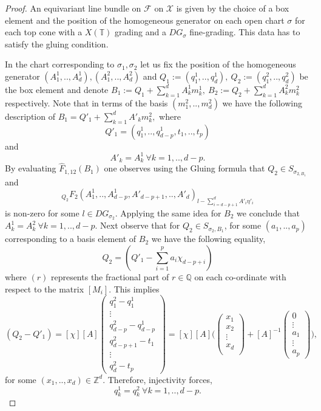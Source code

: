 \documentclass[10pt]{amsart}
\newcommand{\sX}{{\mathcal X}}
\numberwithin{equation}{subsection}
\begin{document}
\begin{proof}
An equivariant line bundle on $\mathscr{F}$ on $\sX$ is given by the choice of a box element and the position of the homogeneous generator on each open chart $\sigma$ for each top cone with a $X(\mathbb{T})$ grading and a $DG_{\sigma}$ fine-grading. This data has to satisfy the gluing condition.\par
In the chart corresponding to $\sigma_1,\sigma_2$ let us fix the position of the homogeneous generator $(A^1_1,..,A^1_d),(A^2_1,..,A^2_d)$ and $Q_1:=(q^1_1,..,q^1_d),\ Q_2:=(q^2_1,..,q^2_d)$ be the box element and denote $B_1:=Q_1+\sum_{k=1}^{d}A^1_km^1_k,\ B_2:=Q_2+\sum_{k=1}^{d}A^2_km^2_k$ respectively. Note that in terms of the basis $(m^2_1,..,m^2_d)$ we have the following description of $B_1=Q'_1+\sum_{k=1}^{d}A'_km^2_k,$ where 
$$Q'_1=(q^1_1,..,q^1_{d-p},t_1,..,t_p)$$ and $$A'_k=A^1_k\ \forall k=1,..,d-p.$$
By evaluating $\hat{F}_{1,12}(B_1)$ one observes using the Gluing formula that $Q_2\in S_{\sigma_{2,B_1}}$ and $${}_{Q_2}F_{2}(A^1_1,..,A^1_{d-p},A'_{d-p+1},..,A'_{d})_{l-\sum_{i=d-p+1}^{d}A'_{i}\eta'_{i}}$$ is non-zero for some $l\in DG_{\sigma_2}$. Applying the same idea for $B_2$ we conclude that $A^1_k=A^2_k\  \forall k=1,..,d-p.$\newline
Next observe that for $Q_2\in S_{\sigma_2,B_1}$, for some $(a_1,..,a_p)$ corresponding to a basis element of $B_2$ we have the following equality,
$$Q_2=(Q'_1-\sum_{i=1}^{p}a_i\chi_{d-p+i})$$ where $(r)$ represents the fractional part of $r\in \mathbb{Q}$ on each co-ordinate with respect to the matrix $[M_i]$.\newline
This implies
$$(Q_2-Q'_1)=[\chi][A]\begin{pmatrix}
    q^2_1-q^1_1\\
    \vdots\\
    q^2_{d-p}-q^1_{d-p}\\
    q^2_{d-p+1}-t_1\\
    \vdots\\
    q^2_{d}-t_p
\end{pmatrix}=[\chi][A]\bigg(\begin{pmatrix}
    x_1\\
    x_2\\
    \vdots\\
    x_d\\
\end{pmatrix}+[A]^{-1}\begin{pmatrix}
    0\\
    \vdots\\
    a_1\\
    \vdots\\
    a_p
\end{pmatrix}\bigg),$$ for some $(x_1,..,x_d)\in \mathbb{Z}^d.$
Therefore, injectivity forces,
$$q^1_k=q^2_k\ \forall k=1,..,d-p.$$


\end{proof}
\end{document}
